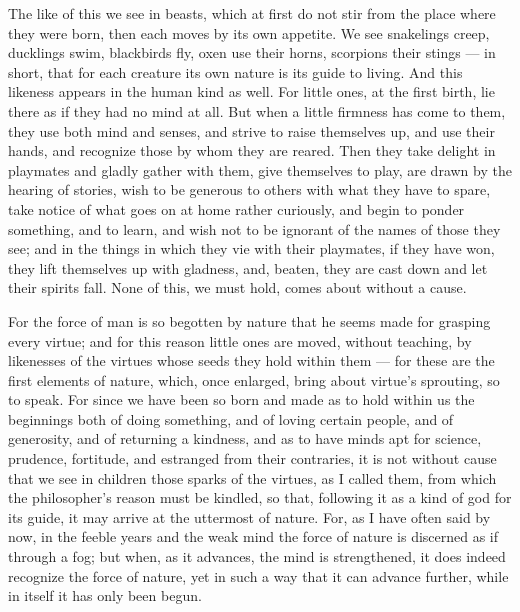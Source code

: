  The like of this we see in beasts, which at first do not stir from the place where they were born, then each moves by its own appetite. We see snakelings creep, ducklings swim, blackbirds fly, oxen use their horns, scorpions their stings — in short, that for each creature its own nature is its guide to living. And this likeness appears in the human kind as well. For little ones, at the first birth, lie there as if they had no mind at all. But when a little firmness has come to them, they use both mind and senses, and strive to raise themselves up, and use their hands, and recognize those by whom they are reared. Then they take delight in playmates and gladly gather with them, give themselves to play, are drawn by the hearing of stories, wish to be generous to others with what they have to spare, take notice of what goes on at home rather curiously, and begin to ponder something, and to learn, and wish not to be ignorant of the names of those they see; and in the things in which they vie with their playmates, if they have won, they lift themselves up with gladness, and, beaten, they are cast down and let their spirits fall. None of this, we must hold, comes about without a cause.

 For the force of man is so begotten by nature that he seems made for grasping every virtue; and for this reason little ones are moved, without teaching, by likenesses of the virtues whose seeds they hold within them — for these are the first elements of nature, which, once enlarged, bring about virtue's sprouting, so to speak. For since we have been so born and made as to hold within us the beginnings both of doing something, and of loving certain people, and of generosity, and of returning a kindness, and as to have minds apt for science, prudence, fortitude, and estranged from their contraries, it is not without cause that we see in children those sparks of the virtues, as I called them, from which the philosopher's reason must be kindled, so that, following it as a kind of god for its guide, it may arrive at the uttermost of nature. For, as I have often said by now, in the feeble years and the weak mind the force of nature is discerned as if through a fog; but when, as it advances, the mind is strengthened, it does indeed recognize the force of nature, yet in such a way that it can advance further, while in itself it has only been begun.

